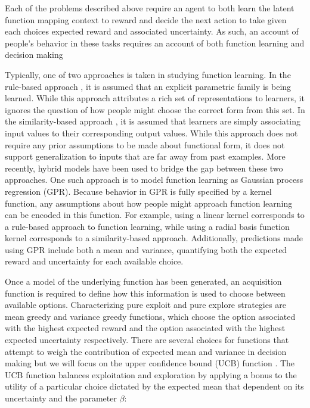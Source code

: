 \documentclass[10pt,letterpaper]{article}
\begin{document}
		Each of the problems described above require an agent to both learn the latent function mapping context to reward and decide the next action to take given each choices expected reward and associated uncertainty. As such, an account of people's behavior in these tasks requires an account of both function learning \cite{} and decision making \cite{}
		
		Typically, one of two approaches is taken in studying function learning. In the rule-based approach \cite{}, it is assumed that an explicit parametric family is being learned. While this approach attributes a rich set of representations to learners, it ignores the question of how people might choose the correct form from this set. In the similarity-based approach \cite{}, it is assumed that learners are simply associating input values to their corresponding output values. While this approach does not require any prior assumptions to be made about functional form, it does not support generalization to inputs that are far away from past examples. More recently, hybrid models have been used to bridge the gap between these two approaches. One such approach is to model function learning as Gaussian process regression (GPR). Because behavior in GPR is fully specified by a kernel function, any assumptions about how people might approach function learning can be encoded in this function. For example, using a linear kernel corresponds to a rule-based approach to function learning, while using a radial basis function kernel corresponds to a similarity-based approach. Additionally, predictions made using GPR include both a mean and variance, quantifying both the expected reward and uncertainty for each available choice.
		
		Once a model of the underlying function has been generated, an acquisition function is required to define how this information is used to choose between available options. Characterizing pure exploit and pure explore strategies are mean greedy and variance greedy functions, which choose the option associated with the highest expected reward and the option associated with the highest expected uncertainty respectively. There are several choices for functions that attempt to weigh the contribution of expected mean and variance in decision making but we will focus on the upper confidence bound (UCB) function \cite{Srinivas2010a}. The UCB function balances exploitation and exploration by applying a bonus to the utility of a particular choice dictated by the expected mean that dependent on its uncertainty and the parameter $\beta$:
		
\end{document}
